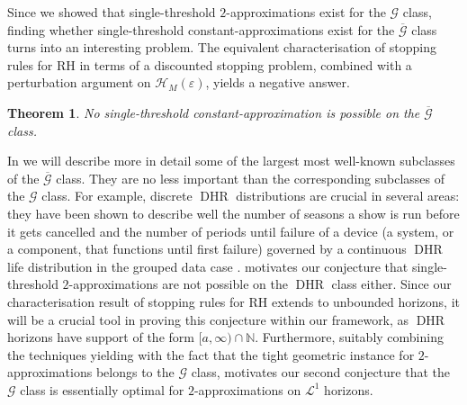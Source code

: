 \documentclass[11pt, a4paper, twoside]{article}
\newcommand{\eps}{\varepsilon}
\newcommand{\NN}{\mathbb{N}}
\newcommand{\PGF}{\mathcal{G}}
\newcommand{\PGFd}{\overline{\mathcal{G}}}
\DeclareMathOperator{\DHR}{DHR}
\newtheorem{theorem}{Theorem}[section]
\numberwithin{equation}{section}
\begin{document}
	Since we showed that single-threshold $2$-approximations exist for the $\PGF$ class, finding whether single-threshold constant-approximations exist for the $\PGFd$ class turns into an interesting problem. The equivalent characterisation of stopping rules for RH in terms of a discounted stopping problem, combined with a perturbation argument on $\mathcal{H}_M(\eps)$, yields a negative answer.
	\begin{theorem}\label{Gdhorizon}
		No single-threshold constant-approximation is possible on the $\PGFd$ class.
	\end{theorem}
	In  we will describe more in detail some of the largest most well-known subclasses of the $\PGFd$ class. They are no less important than the corresponding subclasses of the $\PGF$ class. For example, discrete $\DHR$ distributions are crucial in several areas: they have been shown to describe well the number of seasons a show is run before it gets cancelled and the number of periods until failure of a device (a system, or a component, that functions until first failure) governed by a continuous $\DHR$ life distribution in the grouped data case \cite{Langberg80}.  motivates our conjecture that single-threshold $2$-approximations are not possible on the $\DHR$ class either. Since our characterisation result of stopping rules for RH extends to unbounded horizons, it will be a crucial tool in proving this conjecture within our framework, as $\DHR$ horizons have support of the form $[a,\infty)\cap\NN$. Furthermore, suitably combining the techniques yielding  with the fact that the tight geometric instance for $2$-approximations belongs to the $\PGF$ class, motivates our second conjecture that the $\PGF$ class is essentially optimal for $2$-approximations on $\mathcal{L}^1$ horizons.
	
\end{document}
